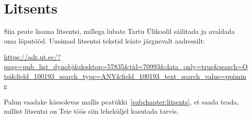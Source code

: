 \section*{Litsents} \label{litsents} 
Siia peate lisama litsentsi, millega lubate Tartu Ülikoolil säilitada ja avaldada oma lõputööd. Uusimad litsentsi tekstid leiate järgnevalt aadressilt:

\url{https://adr.ut.ee/?page=pub_list_dynobj&desktop=57835&tid=70993&data_only=true&search=Otsi&field_100193_search_type=ANY&field_100193_text_search_value=ppimine}

Palun vaadake käesolevas mallis peatükki~\ref{subchapter:litsents}, et saada teada, millist litsentsi on Teie töös siin leheküljel kasutada tarvis.
